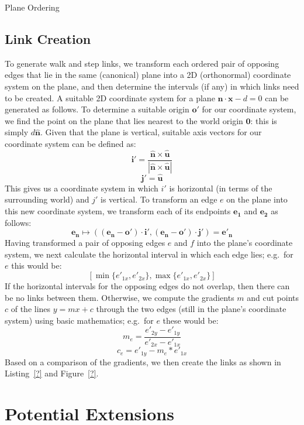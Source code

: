 \documentclass[10pt,twocolumn]{article}
\begin{document}
\begin{stulisting}[t]
\caption{Plane Ordering}
\label{code:plane-ordering}

\end{stulisting}

\subsection{Link Creation}

To generate walk and step links, we transform each ordered pair of opposing edges that lie in the same (canonical) plane into a 2D (orthonormal) coordinate system on the plane, and then determine the intervals (if any) in which links need to be created. A suitable 2D coordinate system for a plane $\mathbf{\hat{n}} \cdot \mathbf{x} - d = 0$ can be generated as follows. To determine a suitable origin $\mathbf{o'}$ for our coordinate system, we find the point on the plane that lies nearest to the world origin $\mathbf{0}$: this is simply $d\mathbf{\hat{n}}$. Given that the plane is vertical, suitable axis vectors for our coordinate system can be defined as:
%
\[
\mathbf{i'} = \frac{\mathbf{\hat{n}} \times \mathbf{\hat{u}}}{\left| \mathbf{\hat{n}} \times \mathbf{\hat{u}} \right|}
\]
\[
\mathbf{j'} = \mathbf{\hat{u}}
\]
%
This gives us a coordinate system in which $i'$ is horizontal (in terms of the surrounding world) and $j'$ is vertical. To transform an edge $e$ on the plane into this new coordinate system, we transform each of its endpoints $\mathbf{e_1}$ and $\mathbf{e_2}$ as follows:
%
\[
\mathbf{e_n} \mapsto ((\mathbf{e_n} - \mathbf{o'}) \cdot \mathbf{i'}, (\mathbf{e_n} - \mathbf{o'}) \cdot \mathbf{j'}) = \mathbf{e'_n}
\]
%
Having transformed a pair of opposing edges $e$ and $f$ into the plane's coordinate system, we next calculate the horizontal interval in which each edge lies; e.g.~for $e$ this would be:
%
\[
\left[ \min\{e'_{1x},e'_{2x}\}, \max\{e'_{1x},e'_{2x}\} \right]
\]
%
If the horizontal intervals for the opposing edges do not overlap, then there can be no links between them. Otherwise, we compute the gradients $m$ and cut points $c$ of the lines $y = mx + c$ through the two edges (still in the plane's coordinate system) using basic mathematics; e.g.~for $e$ these would be:
%
\[
m_e = \frac{e'_{2y} - e'_{1y}}{e'_{2x} - e'_{1x}}
\]
\[
c_e = e'_{1y} - m_e * e'_{1x}
\]
%
Based on a comparison of the gradients, we then create the links as shown in Listing~\ref{?} and Figure~\ref{?}.

\section{Potential Extensions}
\end{document}
